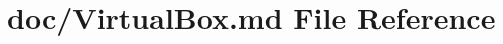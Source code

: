 \hypertarget{VirtualBox_8md}{}\section{doc/\+Virtual\+Box.md File Reference}
\label{VirtualBox_8md}

